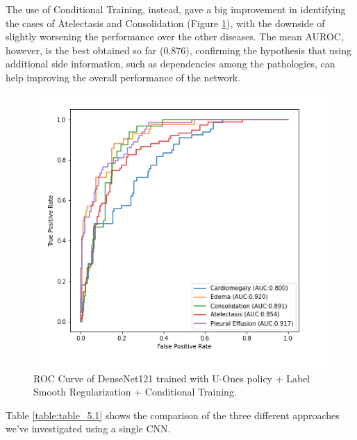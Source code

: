 The use of Conditional Training, instead, gave a big improvement in identifying the cases of Atelectasis and Consolidation (Figure \ref{fig:figure_5.4}), with the downside of slightly worsening the performance over the other diseases. The mean \ac{AUROC}, however, is the best obtained so far (0.876), confirming the hypothesis that using additional side information, such as dependencies among the pathologies, can help improving the overall performance of the network.
\newpage
\begin{figure}[htbp!]
    \centering
    \includegraphics[scale=0.55]{Tesi/images/Results/densenet121_LSR_CT.png}
    \caption[ROC curve for U-Ones+LSR+CT policy]{ROC Curve of DenseNet121 trained with U-Ones policy + Label Smooth Regularization + Conditional Training.}
    \label{fig:figure_5.4}
\end{figure}

\vspace{5mm}

Table \ref{table:table_5.1} shows the comparison of the three different approaches we've investigated using a single CNN.

